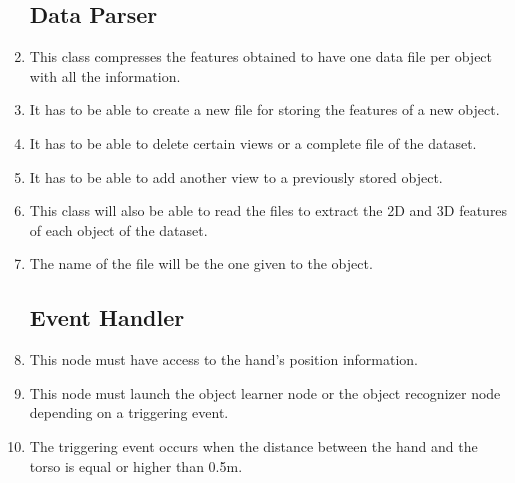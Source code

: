 \begin{enumerate}[label=\textbf{FR\threedigits*}, leftmargin=2cm]
\subsection{Data Parser}
\item This class compresses the features obtained to have one data file per object with all the information.
 
\item It has to be able to create a new file for storing the features of a new object. 
\item It has to be able to delete certain views or a complete file of the dataset. 
\item It has to be able to add another view to a previously stored object. 

\item This class will also be able to read the files to extract the 2D and 3D features of each object of the dataset. 

\item The name of the file will be the one given to the object. 

			
		
	


 
\subsection{Event Handler}
\item This node must have access to the hand's position information. 
\item This node must launch the object learner node or the object recognizer node depending on a triggering event. 
\item The triggering event occurs when the distance between the hand and the torso is equal or higher than 0.5m.   
 


\end{enumerate}
